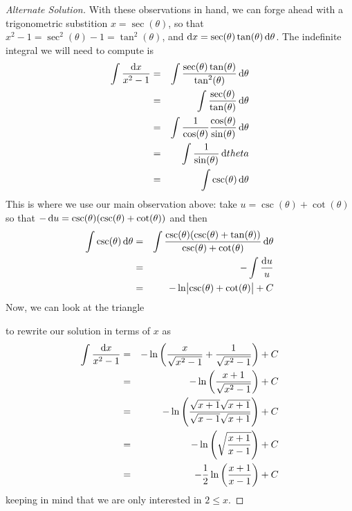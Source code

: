 \documentclass[12pt]{amsart}
\begin{document}
\begin{proof}[Alternate Solution]
  With these observations in hand, we can forge ahead with a trigonometric substition \(x = \sec(\theta)\), so that \(x^2 - 1 = \sec^2(\theta) - 1 = \tan^2(\theta)\), and \(\dif x = \sec(\theta)\tan(\theta)\dif{\theta}\).
  The indefinite integral we will need to compute is
  \begin{eqnarray*}
    \int \frac{\dif x}{x^2 - 1} &=& \int \frac{\sec(\theta)\tan(\theta)}{\tan^2(\theta)}\dif{\theta}\\
    &=& \int \frac{\sec(\theta)}{\tan(\theta)}\dif{\theta}\\
    &=& \int \frac{1}{\cos(\theta)}\frac{\cos(\theta)}{\sin(\theta)}\dif{\theta}\\
    &=& \int \frac{1}{\sin(\theta)}\dif{theta}\\
    &=& \int \csc(\theta)\dif{\theta}\\
  \end{eqnarray*}
  This is where we use our main observation above: take \(u = \csc(\theta) + \cot(\theta)\) so that \(-\dif{u} = \csc(\theta)(\csc(\theta) + \cot(\theta))\) and then
  \begin{eqnarray*}
    \int \csc(\theta) \dif{\theta} &=& \int \frac{\csc(\theta)(\csc(\theta) + \tan(\theta))}{\csc(\theta) + \cot(\theta)}\dif{\theta}\\
    &=& -\int \frac{\dif{u}}{u}\\
    &=& -\ln\abs{\csc(\theta) + \cot(\theta)} + C
  \end{eqnarray*}
  Now, we can look at the triangle
  \begin{center}
  \end{center}
  to rewrite our solution in terms of \(x\) as
  \begin{eqnarray*}
    \int \frac{\dif{x}}{x^2 - 1} &=& -\ln\left(\frac{x}{\sqrt{x^2 - 1}} + \frac{1}{\sqrt{x^2 - 1}}\right) + C\\
    &=& -\ln\left(\frac{x + 1}{\sqrt{x^2 - 1}}\right) + C\\
    &=& -\ln\left( \frac{\sqrt{x + 1}\sqrt{x + 1}}{\sqrt{x - 1}\sqrt{x + 1}}\right) + C\\
    &=& -\ln\left(\sqrt{\frac{x + 1}{x - 1}}\right) + C\\
    &=& -\frac{1}{2} \ln\left(\frac{x + 1}{x -1}\right) + C
  \end{eqnarray*}
  keeping in mind that we are only interested in \(2 \leq x\). 


\end{proof}
\end{document}
